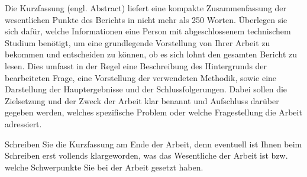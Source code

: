 %
Die Kurzfassung (engl. Abstract) liefert eine kompakte Zusammenfassung der wesentlichen Punkte des Berichts in nicht mehr als 250 Worten. 
Überlegen sie sich dafür, welche Informationen eine Person mit abgeschlossenem technischem Studium benötigt, um eine grundlegende Vorstellung von Ihrer Arbeit zu bekommen und entscheiden zu können, ob es sich lohnt den gesamten Bericht zu lesen.
Dies umfasst in der Regel eine Beschreibung des Hintergrunds der bearbeiteten Frage, eine Vorstellung der verwendeten Methodik, sowie eine Darstellung der Hauptergebnisse und der Schlussfolgerungen.
Dabei sollen die Zielsetzung und der Zweck der Arbeit klar benannt und Aufschluss darüber gegeben werden, welches spezifische Problem oder welche Fragestellung die Arbeit adressiert.
\par
Schreiben Sie die Kurzfassung am Ende der Arbeit, denn eventuell ist Ihnen beim Schreiben erst vollends klargeworden, was das Wesentliche der Arbeit ist bzw. welche
Schwerpunkte Sie bei der Arbeit gesetzt haben.
%